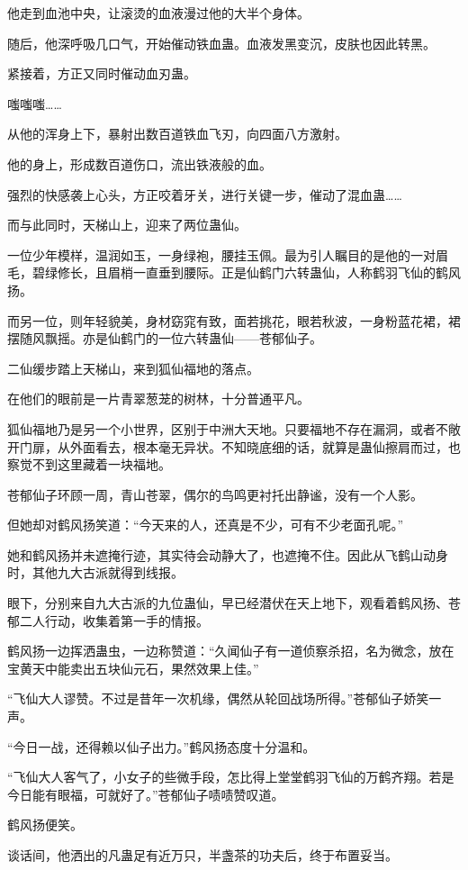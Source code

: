 \begin{this_body}
他走到血池中央，让滚烫的血液漫过他的大半个身体。

随后，他深呼吸几口气，开始催动铁血蛊。血液发黑变沉，皮肤也因此转黑。

紧接着，方正又同时催动血刃蛊。

嗤嗤嗤……

从他的浑身上下，暴射出数百道铁血飞刃，向四面八方激射。

他的身上，形成数百道伤口，流出铁液般的血。

强烈的快感袭上心头，方正咬着牙关，进行关键一步，催动了混血蛊……

而与此同时，天梯山上，迎来了两位蛊仙。

一位少年模样，温润如玉，一身绿袍，腰挂玉佩。最为引人瞩目的是他的一对眉毛，碧绿修长，且眉梢一直垂到腰际。正是仙鹤门六转蛊仙，人称鹤羽飞仙的鹤风扬。

而另一位，则年轻貌美，身材窈窕有致，面若挑花，眼若秋波，一身粉蓝花裙，裙摆随风飘摇。亦是仙鹤门的一位六转蛊仙——苍郁仙子。

二仙缓步踏上天梯山，来到狐仙福地的落点。

在他们的眼前是一片青翠葱茏的树林，十分普通平凡。

狐仙福地乃是另一个小世界，区别于中洲大天地。只要福地不存在漏洞，或者不敞开门扉，从外面看去，根本毫无异状。不知晓底细的话，就算是蛊仙擦肩而过，也察觉不到这里藏着一块福地。

苍郁仙子环顾一周，青山苍翠，偶尔的鸟鸣更衬托出静谧，没有一个人影。

但她却对鹤风扬笑道：“今天来的人，还真是不少，可有不少老面孔呢。”

她和鹤风扬并未遮掩行迹，其实待会动静大了，也遮掩不住。因此从飞鹤山动身时，其他九大古派就得到线报。

眼下，分别来自九大古派的九位蛊仙，早已经潜伏在天上地下，观看着鹤风扬、苍郁二人行动，收集着第一手的情报。

鹤风扬一边挥洒蛊虫，一边称赞道：“久闻仙子有一道侦察杀招，名为微念，放在宝黄天中能卖出五块仙元石，果然效果上佳。”

“飞仙大人谬赞。不过是昔年一次机缘，偶然从轮回战场所得。”苍郁仙子娇笑一声。

“今日一战，还得赖以仙子出力。”鹤风扬态度十分温和。

“飞仙大人客气了，小女子的些微手段，怎比得上堂堂鹤羽飞仙的万鹤齐翔。若是今日能有眼福，可就好了。”苍郁仙子啧啧赞叹道。

鹤风扬便笑。

谈话间，他洒出的凡蛊足有近万只，半盏茶的功夫后，终于布置妥当。


\end{this_body}
